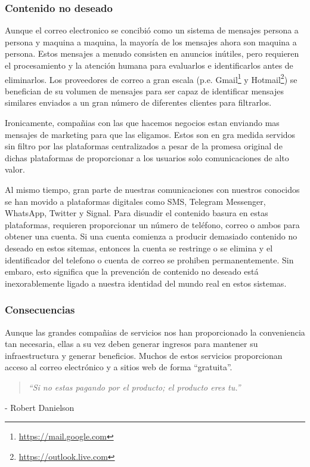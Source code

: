 \documentclass{article}
\newcommand{\chapquote}[2]{\begin{quotation} \textit{#1} \end{quotation} \begin{flushright} - #2\end{flushright} }
\begin{document}
\subsubsection{Contenido no deseado}

Aunque el correo electronico se concibió como un sistema de mensajes persona a persona y maquina a maquina, la mayoría de los mensajes ahora son maquina a persona. Estos mensajes a menudo consisten en anuncios inútiles, pero requieren el procesamiento y la atención humana para evaluarlos e identificarlos antes de eliminarlos. Los proveedores de correo a gran escala (p.e. Gmail\footnote{\url{https://mail.google.com}} y Hotmail\footnote{\url{https://outlook.live.com}}) se benefician de su volumen de mensajes para ser capaz de identificar mensajes similares enviados a un gran número de diferentes clientes para filtrarlos.

Ironicamente, compañias con las que hacemos negocios estan enviando mas mensajes de marketing para que las eligamos. Estos son en gra medida servidos sin filtro por las plataformas centralizados a pesar de la promesa original de dichas plataformas de proporcionar a los usuarios solo comunicaciones de alto valor.

Al mismo tiempo, gran parte de nuestras comunicaciones con nuestros conocidos se han movido a plataformas digitales como SMS, Telegram Messenger, WhatsApp, Twitter y Signal. Para disuadir el contenido basura en estas plataformas, requieren proporcionar un número de teléfono, correo o ambos para obtener una cuenta. Si una cuenta comienza a producir demasiado contenido no deseado en estos sitemas, entonces la cuenta se restringe o se elimina y el identificador del telefono o cuenta de correo se prohiben permanentemente. Sin embaro, esto significa que la prevención de contenido no deseado está inexorablemente ligado a nuestra identidad del mundo real en estos sistemas.

\subsubsection{Consecuencias}

Aunque las grandes compañias de servicios nos han proporcionado la conveniencia tan necesaria, ellas a su vez deben generar ingresos para mantener su infraestructura y generar beneficios. Muchos de estos servicios proporcionan acceso al correo electrónico y a sitios web de forma ``gratuita''.

\chapquote{\large ``Si no estas pagando por el producto; el producto eres tu.''}{Robert Danielson}
\end{document}
